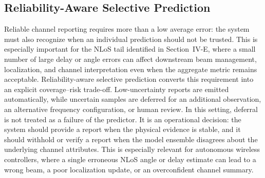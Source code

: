 \subsection{Reliability-Aware Selective Prediction}

Reliable channel reporting requires more than a low average error: the system must also recognize
when an individual prediction should not be trusted. This is especially important for the NLoS tail
identified in Section~IV-E, where a small number of large delay or angle errors can affect downstream
beam management, localization, and channel interpretation even when the aggregate metric remains
acceptable. Reliability-aware selective prediction converts this requirement into an explicit
coverage--risk trade-off. Low-uncertainty reports are emitted automatically, while uncertain samples
are deferred for an additional observation, an alternative frequency configuration, or human review.
In this setting, deferral is not treated as a failure of the predictor. It is an operational decision:
the system should provide a report when the physical evidence is stable, and it should withhold or
verify a report when the model ensemble disagrees about the underlying channel attributes. This is
especially relevant for autonomous wireless controllers, where a single erroneous NLoS angle or delay
estimate can lead to a wrong beam, a poor localization update, or an overconfident channel summary.


